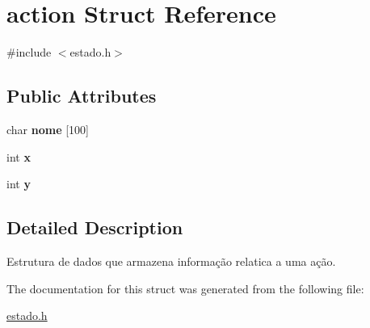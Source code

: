 \hypertarget{structaction}{}\section{action Struct Reference}
\label{structaction}


{\ttfamily \#include $<$estado.\+h$>$}

\subsection*{Public Attributes}
\begin{DoxyCompactItemize}
\item 
\mbox{\label{structaction_a5232ac62e7c67cd36449990d5233ba1e}} 
char {\bfseries nome} \mbox{[}100\mbox{]}
\item 
\mbox{\label{structaction_af2085598c22a5665fbc62549a93f9343}} 
int {\bfseries x}
\item 
\mbox{\label{structaction_ac2324ac6866aadd1f440f4b2f59bc5d2}} 
int {\bfseries y}
\end{DoxyCompactItemize}


\subsection{Detailed Description}
Estrutura de dados que armazena informação relatica a uma ação. 

The documentation for this struct was generated from the following file\+:\begin{DoxyCompactItemize}
\item 
\hyperlink{estado_8h}{estado.\+h}\end{DoxyCompactItemize}
